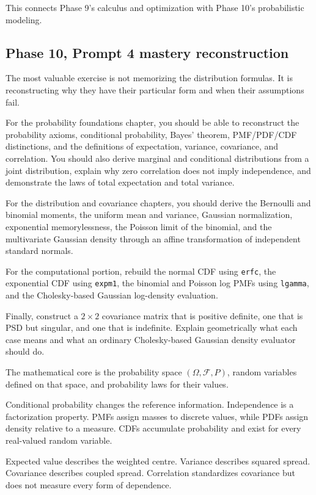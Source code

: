 This connects Phase 9's calculus and optimization with Phase 10's probabilistic modeling.

\subsection{Phase 10, Prompt 4 mastery reconstruction}\label{02-foundations-ii-ch031-phase-10-prompt-4-mastery-reconstruction}

The most valuable exercise is not memorizing the distribution formulas. It is reconstructing why they have their particular form and when their assumptions fail.

For the probability foundations chapter, you should be able to reconstruct the probability axioms, conditional probability, Bayes' theorem, PMF/PDF/CDF distinctions, and the definitions of expectation, variance, covariance, and correlation. You should also derive marginal and conditional distributions from a joint distribution, explain why zero correlation does not imply independence, and demonstrate the laws of total expectation and total variance.

For the distribution and covariance chapters, you should derive the Bernoulli and binomial moments, the uniform mean and variance, Gaussian normalization, exponential memorylessness, the Poisson limit of the binomial, and the multivariate Gaussian density through an affine transformation of independent standard normals.

For the computational portion, rebuild the normal CDF using \texttt{erfc}, the exponential CDF using \texttt{expm1}, the binomial and Poisson log PMFs using \texttt{lgamma}, and the Cholesky-based Gaussian log-density evaluation.

Finally, construct a \(2\times2\) covariance matrix that is positive definite, one that is PSD but singular, and one that is indefinite. Explain geometrically what each case means and what an ordinary Cholesky-based Gaussian density evaluator should do.

The mathematical core is the probability space \((\Omega,\mathcal F,P)\), random variables defined on that space, and probability laws for their values.

Conditional probability changes the reference information. Independence is a factorization property. PMFs assign masses to discrete values, while PDFs assign density relative to a measure. CDFs accumulate probability and exist for every real-valued random variable.

Expected value describes the weighted centre. Variance describes squared spread. Covariance describes coupled spread. Correlation standardizes covariance but does not measure every form of dependence.

